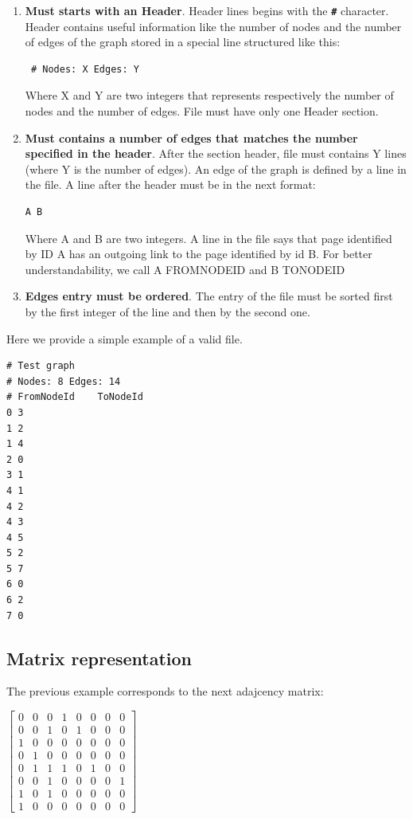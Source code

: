 \documentclass[10pt]{article}
\begin{document}
\begin{enumerate}
    \item {\bf Must starts with an Header}. Header lines begins with the {\bf \texttt{\#}} character. Header contains useful information like the number of nodes and the number of edges of the graph stored in a special line structured like this:
    \begin{verbatim} # Nodes: X Edges: Y \end{verbatim}
    Where X and Y are two integers that represents respectively the number of nodes and the number of edges.
    File must have only one Header section.
    \item {\bf Must contains a number of edges that matches the number specified in the header}. After the section header, file must contains Y lines (where Y is the number of edges). An edge of the graph is defined by a line in the file. A line after the header must be in the next format:
    \begin{verbatim}A B\end{verbatim}
    Where A and B are two integers. A line in the file says that page identified by ID A has an outgoing link to the page identified by id B. 
    For better understandability, we call A FROMNODEID and B TONODEID
    \item {\bf Edges entry must be ordered}. The entry of the file must be sorted first by the first integer of the line and then by the second one.
\end{enumerate}
Here we provide a simple example of a valid file.
\begin{verbatim}
# Test graph
# Nodes: 8 Edges: 14
# FromNodeId	ToNodeId
0 3
1 2
1 4
2 0
3 1
4 1
4 2
4 3
4 5
5 2
5 7
6 0
6 2
7 0
\end{verbatim}
\subsection{Matrix representation}
The previous example corresponds to the next adajcency matrix:

$ \begin{bmatrix}
    0 & 0 & 0 & 1 & 0 & 0 & 0 & 0 \\
    0 & 0 & 1 & 0 & 1 & 0 & 0 & 0 \\
    1 & 0 & 0 & 0 & 0 & 0 & 0 & 0 \\
    0 & 1 & 0 & 0 & 0 & 0 & 0 & 0 \\
    0 & 1 & 1 & 1 & 0 & 1 & 0 & 0 \\
    0 & 0 & 1 & 0 & 0 & 0 & 0 & 1 \\
    1 & 0 & 1 & 0 & 0 & 0 & 0 & 0 \\
    1 & 0 & 0 & 0 & 0 & 0 & 0 & 0 
    \end{bmatrix}  $
\end{document}
